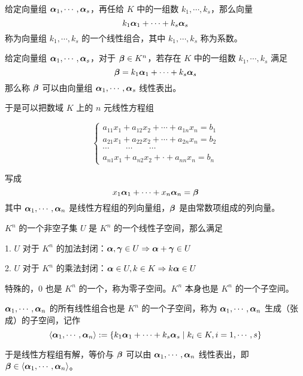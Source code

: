 \begin{definition}[线性组合]
	给定向量组 $\boldsymbol{\alpha}_1,\cdots,\boldsymbol{\alpha}_s$，再任给 $K$ 中的一组数 $k_1,\cdots,k_s$，那么向量
	$$k_1 \boldsymbol{\alpha}_1+\cdots+k_s \boldsymbol{\alpha}_s$$
	称为向量组 $k_1,\cdots,k_s$ 的一个线性组合，其中 $k_1,\cdots,k_s$ 称为系数。
\end{definition}

\begin{definition}[线性表出]
	给定向量组 $\boldsymbol{\alpha}_1,\cdots,\boldsymbol{\alpha}_s$，对于 $\boldsymbol{\beta} \in K^n$，若存在 $K$ 中的一组数 $k_1,\cdots,k_s$ 满足
	$$\boldsymbol{\beta} = k_1\boldsymbol{\alpha}_1+\cdots+k_s\boldsymbol{\alpha}_s$$
	那么称 $\boldsymbol{\beta}$ 可以由向量组 $\boldsymbol{\alpha}_1,\cdots,\boldsymbol{\alpha}_s$ 线性表出。
\end{definition}

于是可以把数域 $K$ 上的 $n$ 元线性方程组

\begin{equation*}
	\left\{
		\begin{matrix}
			a_{11}x_1+a_{12}x_2+\cdots+a_{1n}x_n=b_1\\
			a_{21}x_1+a_{22}x_2+\cdots+a_{2n}x_n=b_2\\
			\cdots\qquad\cdots\qquad\cdots\\
			a_{n1}x_1+a_{n2}x_2+\cdot +a_{nn}x_n=b_n
		\end{matrix}
	\right.
\end{equation*}

写成
$$x_1\boldsymbol{\alpha}_1+\cdots+x_n\boldsymbol{\alpha}_n=\boldsymbol{\beta}$$
其中 $\boldsymbol{\alpha}_1,\cdots,\boldsymbol{\alpha}_n$ 是线性方程组的列向量组，$\boldsymbol{\beta}$ 是由常数项组成的列向量。

\begin{definition}[线性子空间]
	$K^n$ 的一个非空子集 $U$ 是 $K^n$ 的一个线性子空间，那么满足
	
	1. $U$ 对于 $K^n$ 的加法封闭：$\boldsymbol{\alpha},\boldsymbol{\gamma}\in U \Rightarrow \boldsymbol{\alpha}+\boldsymbol{\gamma} \in U$

	2. $U$ 对于 $K^n$ 的乘法封闭：$\boldsymbol{\alpha} \in U,k\in K \Rightarrow k\boldsymbol{\alpha} \in U$
\end{definition}

特殊的，${0}$ 也是 $K^n$ 的一个，称为零子空间。$K^n$ 本身也是 $K^n$ 的一个子空间。

$\boldsymbol{\alpha}_1,\cdots,\boldsymbol{\alpha}_n$ 的所有线性组合也是 $K^n$ 的一个子空间，称为 $\boldsymbol{\alpha}_1,\cdots,\boldsymbol{\alpha}_n$ 生成（张成）的子空间，记作
$$\langle \boldsymbol{\alpha}_1,\cdots,\boldsymbol{\alpha}_n\rangle:=\{k_1\boldsymbol{\alpha}_1+\cdots+k_s\boldsymbol{\alpha}_s \mid k_i\in K,i=1,\cdots,s\}$$

于是线性方程组有解，等价与 $\boldsymbol{\beta}$ 可以由 $\boldsymbol{\alpha}_1,\cdots,\boldsymbol{\alpha}_n$ 线性表出，即 $\boldsymbol{\beta} \in \langle\boldsymbol{\alpha}_1,\cdots,\boldsymbol{\alpha}_n\rangle$。




